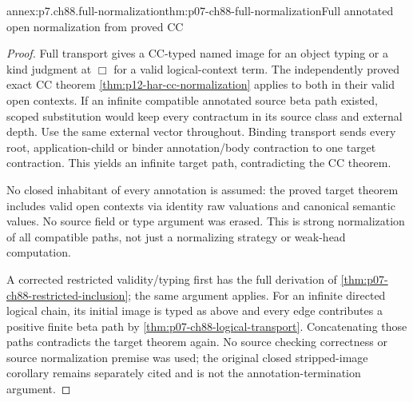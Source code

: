 \begin{annexitem}{annex:p7.ch88.full-normalization}{thm:p07-ch88-full-normalization}{Full annotated open normalization from proved CC}
\begin{proof}
Full transport gives a CC-typed named image for an object typing or a kind judgment at \(\Box\) for a valid logical-context term. The independently proved exact CC theorem \cref{thm:p12-har-cc-normalization} applies to both in their valid open contexts. If an infinite compatible annotated source beta path existed, scoped substitution would keep every contractum in its source class and external depth. Use the same external vector throughout. Binding transport sends every root, application-child or binder annotation/body contraction to one target contraction. This yields an infinite target path, contradicting the CC theorem.

No closed inhabitant of every annotation is assumed: the proved target theorem includes valid open contexts via identity raw valuations and canonical semantic values. No source field or type argument was erased. This is strong normalization of all compatible paths, not just a normalizing strategy or weak-head computation.

A corrected restricted validity/typing first has the full derivation of \cref{thm:p07-ch88-restricted-inclusion}; the same argument applies. For an infinite directed logical chain, its initial image is typed as above and every edge contributes a positive finite beta path by \cref{thm:p07-ch88-logical-transport}. Concatenating those paths contradicts the target theorem again. No source checking correctness or source normalization premise was used; the original closed stripped-image corollary remains separately cited and is not the annotation-termination argument.
\end{proof}
\end{annexitem}
